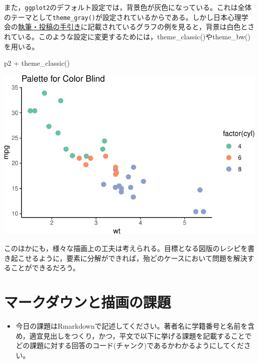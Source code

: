 \documentclass[
  a4paper,
]{ltjsbook}
\newenvironment{Shaded}{\begin{snugshade}}{\end{snugshade}}
\newcommand{\FunctionTok}[1]{\textcolor[rgb]{0.28,0.35,0.67}{#1}}
\newcommand{\NormalTok}[1]{\textcolor[rgb]{0.00,0.23,0.31}{#1}}
\newcommand{\SpecialCharTok}[1]{\textcolor[rgb]{0.37,0.37,0.37}{#1}}
\providecommand{\tightlist}{%
  \setlength{\itemsep}{0pt}\setlength{\parskip}{0pt}}\usepackage{longtable,booktabs,array}
\begin{document}
また，\texttt{ggplot2}のデフォルト設定では，背景色が灰色になっている。これは全体のテーマとして\texttt{theme\_gray()}が設定されているからである。しかし日本心理学会の\href{https://psych.or.jp/manual/}{執筆・投稿の手引き}に記載されているグラフの例を見ると，背景は白色とされている。このような設定に変更するためには，theme\_classic()やtheme\_bw()を用いる。

\begin{Shaded}
\begin{Highlighting}[]
\NormalTok{p2 }\SpecialCharTok{+} \FunctionTok{theme\_classic}\NormalTok{()}
\end{Highlighting}
\end{Shaded}

\includegraphics{chapter04_files/figure-pdf/unnamed-chunk-3-1.pdf}

このほかにも，様々な描画上の工夫は考えられる。目標となる図版のレシピを書き起こせるように，要素に分解ができれば，殆どのケースにおいて問題を解決することができるだろう。

\section{マークダウンと描画の課題}\label{ux30deux30fcux30afux30c0ux30a6ux30f3ux3068ux63cfux753bux306eux8ab2ux984c}

\begin{itemize}
\tightlist
\item
  今日の課題はRmarkdownで記述してください。著者名に学籍番号と名前を含め，適宜見出しをつくり，かつ，平文で以下に挙げる課題を記載することでどの課題に対する回答のコード(チャンク)であるかわかるようにしてください。
\end{itemize}
\end{document}
